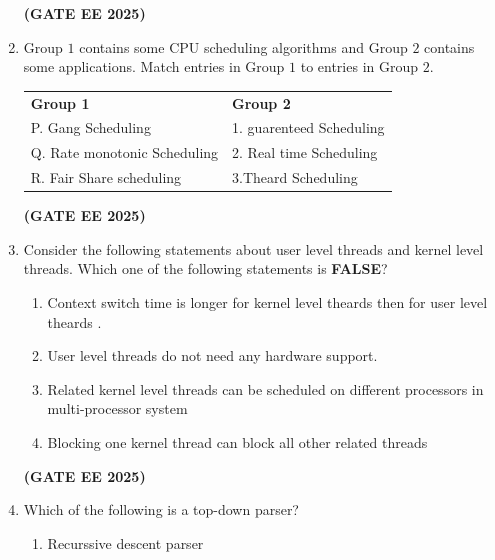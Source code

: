 \documentclass[journal,12pt,onecolumn]{IEEEtran}
\theoremstyle{remark}
\begin{document}
\begin{enumerate}
\begin{enumerate}
\end{enumerate}
\hfill \textbf{(GATE EE 2025)}
    \item    Group $1$ contains some CPU scheduling algorithms and Group $2$ contains some applications. Match entries in Group $1$ to entries in Group $2$.
   
    
    
    \begin{tabular}{p{}p{}}


       \textbf{Group 1} &  \textbf{Group  2} \\ 
    P. Gang Scheduling &  1.  guarenteed Scheduling\\
   
    Q. Rate monotonic Scheduling &  2.  Real time Scheduling \\
     R.  Fair Share scheduling  &  3.Theard Scheduling \\
    \end{tabular}
\begin{enumerate}
\end{enumerate}
    \hfill \textbf{(GATE EE 2025)}
\item   Consider the following statements about user level threads and kernel level threads. Which one of the following statements is \textbf{FALSE}?
\begin{enumerate}
    \item  Context switch time  is longer for kernel level theards then for user level theards .
    \item User level threads do not need any hardware support.
    \item Related kernel level threads can be scheduled  on different processors in multi-processor  system 
    \item Blocking one kernel thread can block all other related threads
  \end{enumerate} 
 \hfill \textbf{(GATE EE 2025)}
  \item Which of the following is a top-down parser?
  \begin{enumerate}
      \item  Recurssive descent parser 

\end{enumerate}
\end{enumerate}
\end{document}
